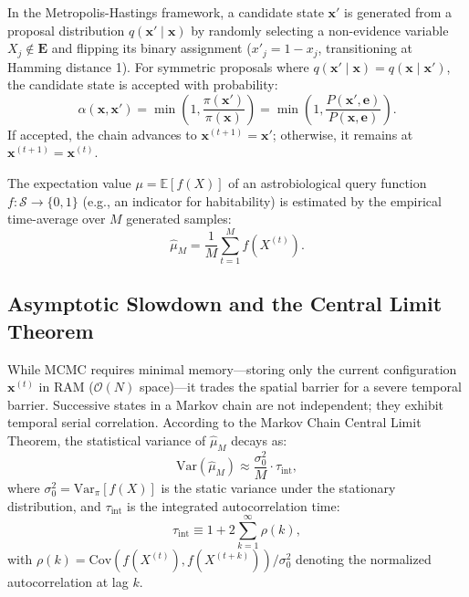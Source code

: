 In the Metropolis-Hastings framework, a candidate state $\mathbf{x}'$ is generated from a proposal distribution $q(\mathbf{x}' \mid \mathbf{x})$ by randomly selecting a non-evidence variable $X_j \notin \mathbf{E}$ and flipping its binary assignment ($x'_j = 1 - x_j$, transitioning at Hamming distance 1). For symmetric proposals where $q(\mathbf{x}' \mid \mathbf{x}) = q(\mathbf{x} \mid \mathbf{x}')$, the candidate state is accepted with probability:
\begin{equation}
\alpha(\mathbf{x}, \mathbf{x}') = \min\left(1, \frac{\pi(\mathbf{x}')}{\pi(\mathbf{x})}\right) = \min\left(1, \frac{P(\mathbf{x}', \mathbf{e})}{P(\mathbf{x}, \mathbf{e})}\right).
\label{eq:metropolis_hastings_acceptance_ch2}
\end{equation}
If accepted, the chain advances to $\mathbf{x}^{(t+1)} = \mathbf{x}'$; otherwise, it remains at $\mathbf{x}^{(t+1)} = \mathbf{x}^{(t)}$.

The expectation value $\mu = \mathbb{E}[f(X)]$ of an astrobiological query function $f: \mathcal{S} \to \{0, 1\}$ (e.g., an indicator for habitability) is estimated by the empirical time-average over $M$ generated samples:
\begin{equation}
\hat{\mu}_M = \frac{1}{M} \sum_{t=1}^M f\left(X^{(t)}\right).
\label{eq:empirical_mcmc_estimator}
\end{equation}

\subsection{Asymptotic Slowdown and the Central Limit Theorem}
While MCMC requires minimal memory---storing only the current configuration $\mathbf{x}^{(t)}$ in RAM ($\mathcal{O}(N)$ space)---it trades the spatial barrier for a severe temporal barrier. Successive states in a Markov chain are not independent; they exhibit temporal serial correlation. According to the Markov Chain Central Limit Theorem, the statistical variance of $\hat{\mu}_M$ decays as:
\begin{equation}
\mathrm{Var}(\hat{\mu}_M) \approx \frac{\sigma_0^2}{M} \cdot \tau_{\mathrm{int}},
\label{eq:clt_mcmc_variance_ch2}
\end{equation}
where $\sigma_0^2 = \mathrm{Var}_{\pi}[f(X)]$ is the static variance under the stationary distribution, and $\tau_{\mathrm{int}}$ is the integrated autocorrelation time:
\begin{equation}
\tau_{\mathrm{int}} \equiv 1 + 2 \sum_{k=1}^\infty \rho(k),
\label{eq:integrated_autocorrelation_time}
\end{equation}
with $\rho(k) = \mathrm{Cov}(f(X^{(t)}), f(X^{(t+k)})) / \sigma_0^2$ denoting the normalized autocorrelation at lag $k$. 


